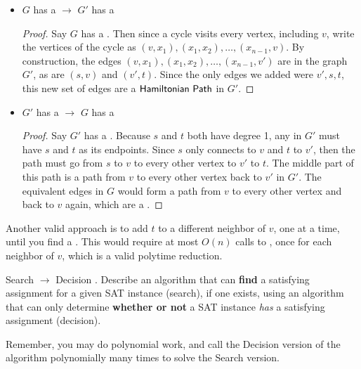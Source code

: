 \begin{questions}
\begin{solution}
\begin{itemize}
        \begin{itemize}
          \item $G$ has a \HC $\to$ $G'$ has a \HP

            \begin{proof}
              Say $G$ has a \HC. Then since a cycle visits every vertex,
              including $v$, write the vertices of the cycle as $(v, x_1), (x_1,
              x_2), \ldots, (x_{n-1}, v)$. By construction, the edges $(v, x_1),
              (x_1, x_2), \ldots, (x_{n-1}, v')$ are in the graph $G'$, as are
              $(s,v)$ and $(v', t)$. Since the only edges we added were $v', s,
              t$, this new set of edges are a $\mathsf{Hamiltonian\ Path}$ in $G'$.
            \end{proof}

          \item $G'$ has a \HP $\to$ $G$ has a \HC

            \begin{proof}
            Say $G'$ has a \HP.
            Because $s$ and $t$ both have degree 1, any \HP in $G'$ must have
            $s$ and $t$ as its endpoints. Since $s$ only connects to $v$ and
            $t$ to $v'$, then the path must go from $s$ to $v$ to every other
            vertex to $v'$ to $t$. The middle part of this path is a path from
            $v$ to every other vertex back to $v'$ in $G'$. The equivalent
            edges in $G$ would form a path from $v$ to every other vertex and
            back to $v$ again, which are a \HC.
            \end{proof}
        \end{itemize}
    \end{itemize}

    Another valid approach is to add $t$ to a different neighbor of $v$, one
    at a time, until you find a \HP. This would require at most $O(n)$ calls
    to \HP, once for each neighbor of $v$, which is a valid polytime
    reduction.
  \end{solution}

  \question[20] Search \SAT $\to$ Decision \SAT. 
  Describe an algorithm that can {\bf find} a satisfying assignment for a
  given SAT instance (search), if one exists, using an algorithm that can only
  determine {\bf whether or not} a SAT instance \emph{has} a satisfying
  assignment (decision).

  Remember, you may do polynomial work, and call the Decision version of the
  algorithm polynomially many times to solve the Search version.


\end{questions}
